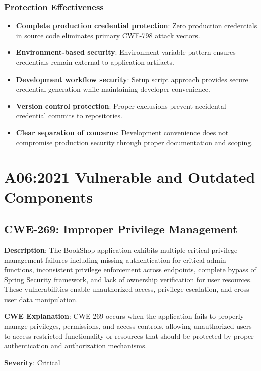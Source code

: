 \documentclass[]{UCD_CS_FYP_Report}
\begin{document}
\subsection{Protection Effectiveness}
\begin{itemize}
	\item \textbf{Complete production credential protection}: Zero production credentials in source code eliminates primary CWE-798 attack vectors.
	\item \textbf{Environment-based security}: Environment variable pattern ensures credentials remain external to application artifacts.
	\item \textbf{Development workflow security}: Setup script approach provides secure credential generation while maintaining developer convenience.
	\item \textbf{Version control protection}: Proper exclusions prevent accidental credential commits to repositories.
	\item \textbf{Clear separation of concerns}: Development convenience does not compromise production security through proper documentation and scoping.
\end{itemize}



\chapter{A06:2021 Vulnerable and Outdated Components}

\section{CWE-269: Improper Privilege Management}

\textbf{Description}: The BookShop application exhibits multiple critical privilege management failures including missing authentication for critical admin functions, inconsistent privilege enforcement across endpoints, complete bypass of Spring Security framework, and lack of ownership verification for user resources. These vulnerabilities enable unauthorized access, privilege escalation, and cross-user data manipulation.

\textbf{CWE Explanation}: CWE-269 occurs when the application fails to properly manage privileges, permissions, and access controls, allowing unauthorized users to access restricted functionality or resources that should be protected by proper authentication and authorization mechanisms.

\textbf{Severity}: Critical
\end{document}
